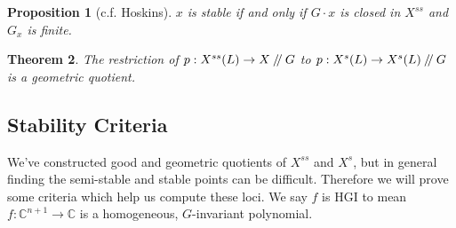 \documentclass{article}
\newtheorem{theorem}{Theorem}
\newtheorem{prop}[theorem]{Proposition}
\theoremstyle{definition}
\theoremstyle{remark}
\numberwithin{theorem}{section}
\newcommand{\C}{\mathbb{C}}
\newcommand{\sslash}{\mathbin{/\mkern-4mu/}}
\newenvironment{thm}{
\begin{mdframed}
	\vspace{-0.5em}
	\begin{theorem}
}{
	\end{theorem}
\end{mdframed}
}
\begin{document}
	\begin{prop}[c.f. Hoskins]
		$x$ is stable if and only if $G\cdot x$ is closed in $X^{ss}$ and $G_x$ is finite.
	\end{prop}
	
	\begin{thm}
		The restriction of $p:X^{ss}(L)\to X\sslash G$ to $p:X^s(L)\to X^s(L)\sslash G$ is a geometric quotient.
	\end{thm}
	
\subsection{Stability Criteria}
	We've constructed good and geometric quotients of $X^{ss}$ and $X^{s}$, but in general finding the semi-stable and stable points can be difficult. Therefore we will prove some criteria which help us compute these loci. We say $f$ is HGI to mean $f:\C^{n+1}\to\C$ is a homogeneous, $G$-invariant polynomial.
	
\end{document}
